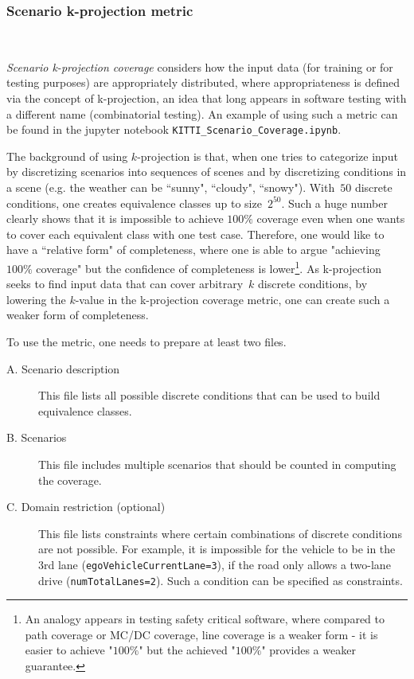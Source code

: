 \documentclass{article}
\begin{document}
\subsubsection{Scenario k-projection metric}~\label{sub.sec.scenario.k.projection}

\emph{Scenario k-projection coverage} considers how the input data (for training or for testing purposes) are appropriately distributed, where appropriateness is defined via the concept of k-projection, an idea that long appears in software testing with a different name (combinatorial testing). An example of using such a metric can be found in the jupyter notebook \texttt{KITTI\_Scenario\_Coverage.ipynb}.



The background of using $k$-projection is that, when one tries to categorize input by discretizing scenarios into sequences of scenes and by discretizing conditions in a scene (e.g. the weather can be ``sunny", ``cloudy", ``snowy"). With~$50$ discrete conditions, one creates equivalence classes up to size~$2^{50}$. Such a huge number clearly shows that it is impossible to achieve $100\%$ coverage even when one wants to cover each equivalent class with one test case. Therefore, one would like to have a ``relative form" of completeness, where one is able to argue "achieving $100\%$ coverage" but the confidence of completeness is lower\footnote{An analogy appears in testing safety critical software, where compared to path coverage or MC/DC coverage, line coverage is a weaker form - it is easier to achieve "$100\%$" but the achieved "$100\%$" provides a weaker guarantee.}. As k-projection seeks to find input data that can cover arbitrary~$k$ discrete conditions, by lowering the $k$-value in the k-projection coverage metric, one can create such a weaker form of completeness. 

 
\vspace{3mm}
To use the metric, one needs to prepare at least two files.
\begin{description}
     \item[A. Scenario description] This file lists all possible discrete conditions that can be used to build equivalence classes.  
    \item[B. Scenarios] This file includes multiple scenarios that should be counted in computing the coverage.
    \item[C. Domain restriction (optional)] This file lists constraints where certain combinations of discrete conditions are not possible. For example, it is impossible for the vehicle to be in the 3rd lane (\texttt{egoVehicleCurrentLane=3}), if the road only allows a two-lane drive (\texttt{numTotalLanes=2}). Such a condition can be specified as constraints. 
\end{description}
\end{document}
